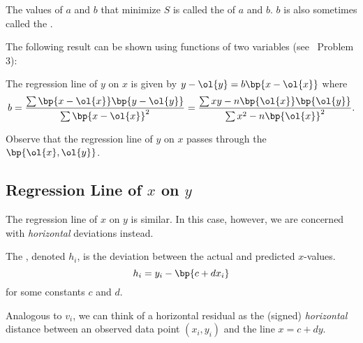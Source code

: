 The values of $a$ and $b$ that minimize $S$ is called the  of $a$ and $b$. $b$ is also sometimes called the .

The following result can be shown using functions of two variables (see~ Problem 3):

\begin{proposition}
    The regression line of $y$ on $x$ is given by $y - \ol{y} = b \bp{x - \ol{x}}$ where \[b = \frac{\sum \bp{x-\ol{x}} \bp{y - \ol{y}}}{\sum \bp{x-\ol{x}}^2} = \frac{\sum xy - n \bp{\ol{x}}\bp{\ol{y}}}{\sum x^2 - n \bp{\ol{x}}^2}.\]
\end{proposition}

Observe that the regression line of $y$ on $x$ passes through the  $\bp{\ol{x}, \ol{y}}$.

\subsection{Regression Line of $x$ on $y$}

The regression line of $x$ on $y$ is similar. In this case, however, we are concerned with \emph{horizontal} deviations instead.

\begin{definition}
    The , denoted $h_i$, is the deviation between the actual and predicted $x$-values. \[h_i = y_i - \bp{c + d x_i}\] for some constants $c$ and $d$.
\end{definition}

Analogous to $v_i$, we can think of a horizontal residual as the (signed) \emph{horizontal} distance between an observed data point $(x_i, y_i)$ and the line $x = c + dy$.

